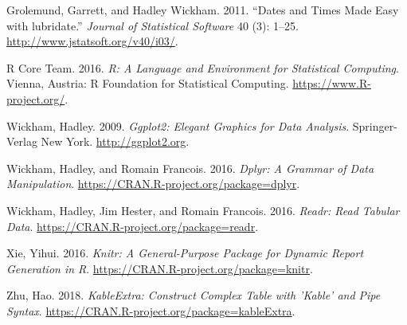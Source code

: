 \documentclass[]{article}
\begin{document}
\hypertarget{ref-lubridate}{}
Grolemund, Garrett, and Hadley Wickham. 2011. ``Dates and Times Made
Easy with lubridate.'' \emph{Journal of Statistical Software} 40 (3):
1--25. \url{http://www.jstatsoft.org/v40/i03/}.

\hypertarget{ref-baseR}{}
R Core Team. 2016. \emph{R: A Language and Environment for Statistical
Computing}. Vienna, Austria: R Foundation for Statistical Computing.
\url{https://www.R-project.org/}.

\hypertarget{ref-ggplot2}{}
Wickham, Hadley. 2009. \emph{Ggplot2: Elegant Graphics for Data
Analysis}. Springer-Verlag New York. \url{http://ggplot2.org}.

\hypertarget{ref-dplyr}{}
Wickham, Hadley, and Romain Francois. 2016. \emph{Dplyr: A Grammar of
Data Manipulation}. \url{https://CRAN.R-project.org/package=dplyr}.

\hypertarget{ref-readr}{}
Wickham, Hadley, Jim Hester, and Romain Francois. 2016. \emph{Readr:
Read Tabular Data}. \url{https://CRAN.R-project.org/package=readr}.

\hypertarget{ref-knitr}{}
Xie, Yihui. 2016. \emph{Knitr: A General-Purpose Package for Dynamic
Report Generation in R}. \url{https://CRAN.R-project.org/package=knitr}.

\hypertarget{ref-kableExtra}{}
Zhu, Hao. 2018. \emph{KableExtra: Construct Complex Table with 'Kable'
and Pipe Syntax}. \url{https://CRAN.R-project.org/package=kableExtra}.
\end{document}
